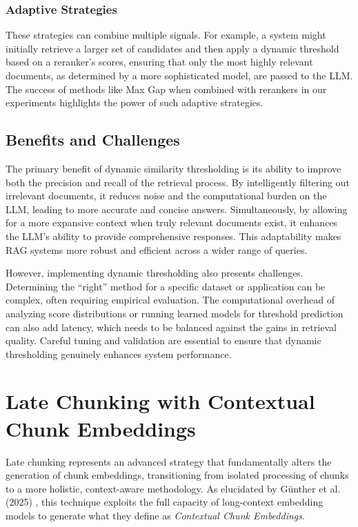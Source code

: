 \subsubsection{Adaptive Strategies}
These strategies can combine multiple signals. For example, a system might initially retrieve a larger set of candidates and then apply a dynamic threshold based on a reranker's scores, ensuring that only the most highly relevant documents, as determined by a more sophisticated model, are passed to the LLM. The success of methods like Max Gap when combined with rerankers in our experiments highlights the power of such adaptive strategies.

\subsection{Benefits and Challenges}
The primary benefit of dynamic similarity thresholding is its ability to improve both the precision and recall of the retrieval process. By intelligently filtering out irrelevant documents, it reduces noise and the computational burden on the LLM, leading to more accurate and concise answers. Simultaneously, by allowing for a more expansive context when truly relevant documents exist, it enhances the LLM's ability to provide comprehensive responses. This adaptability makes RAG systems more robust and efficient across a wider range of queries.

However, implementing dynamic thresholding also presents challenges. Determining the \enquote{right} method for a specific dataset or application can be complex, often requiring empirical evaluation. The computational overhead of analyzing score distributions or running learned models for threshold prediction can also add latency, which needs to be balanced against the gains in retrieval quality. Careful tuning and validation are essential to ensure that dynamic thresholding genuinely enhances system performance.

\section{Late Chunking with Contextual Chunk Embeddings}
Late chunking represents an advanced strategy that fundamentally alters the generation of chunk embeddings, transitioning from isolated processing of chunks to a more holistic, context-aware methodology. As elucidated by Günther et al. (2025) \autocite{günther2025latechunkingcontextualchunk}, this technique exploits the full capacity of long-context embedding models to generate what they define as \textit{Contextual Chunk Embeddings}.

